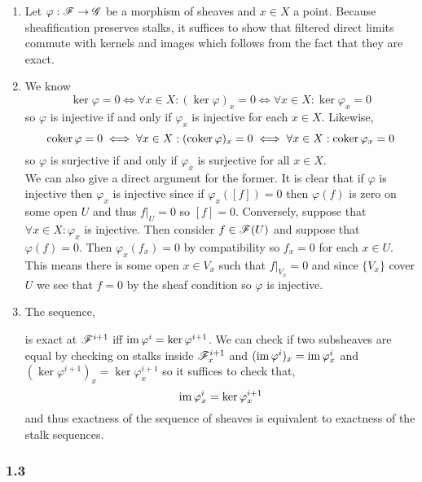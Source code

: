 \documentclass[12pt]{article}
\begin{document}
\begin{enumerate}
\item Let $\varphi : \mathscr{F} \to \mathscr{G}$ be a morphism of sheaves and $x \in X$ a point. Because sheafification preserves stalks, it suffices to show that filtered direct limits commute with kernels and images which follows from the fact that they are exact.

\item We know 
\[ \ker{\varphi} = 0 \iff \forall x \in X : (\ker{\varphi})_x = 0 \iff \forall x \in X : \ker{\varphi_x} = 0 \]
so $\varphi$ is injective if and only if $\varphi_x$ is injective for each $x \in X$. Likewise,
\[ \operatorname{\mathrm{coker}}{\varphi} = 0 \iff \forall x \in X : (\operatorname{\mathrm{coker}}{\varphi})_x = 0 \iff \forall x \in X : \operatorname{\mathrm{coker}}{\varphi_x} = 0 \]
so $\varphi$ is surjective if and only if $\varphi_x$ is surjective for all $x \in X$.
\bigskip\\
We can also give a direct argument for the former. It is clear that if $\varphi$ is injective then $\varphi_x$ is injective since if $\varphi_x([f]) = 0$ then $\varphi(f)$ is zero on some open $U$ and thus $f|_U = 0$ so $[f] = 0$. Conversely, suppose that $\forall x \in X : \varphi_x$ is injective. Then consider $f \in \mathscr{F}(U)$ and suppose that $\varphi(f) = 0$. Then $\varphi_x(f_x) = 0$ by compatibility so $f_x = 0$ for each $x \in U$. This means there is some open $x \in V_x$ such that $f|_{V_x} = 0$ and since $\{ V_x \}$ cover $U$ we see that $f = 0$ by the sheaf condition so $\varphi$ is injective.

\item The sequence,
\begin{center}
\end{center}
is exact at $\mathscr{F}^{i+1}$ iff $\operatorname{\mathrm{im}}{\varphi^i} = \ker{\varphi^{i+1}}$. We can check if two subsheaves are equal by checking on stalks inside $\mathscr{F}^{i+1}_x$ and $(\operatorname{\mathrm{im}}{\varphi^i})_x = \operatorname{\mathrm{im}}{\varphi^i_x}$ and $(\ker{\varphi^{i+1}})_x = \ker{\varphi^{i+1}_x}$ so it suffices to check that,
\[ \operatorname{\mathrm{im}}{\varphi^{i}_x} = \ker{\varphi^{i+1}_x} \]
and thus exactness of the sequence of sheaves is equivalent to exactness of the stalk sequences.
\end{enumerate}

\subsubsection{1.3}
\end{document}
